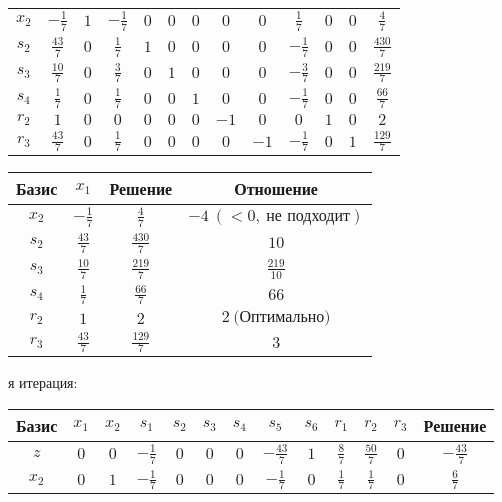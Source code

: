 \documentclass{article}%
\begin{document}
\begin{flushleft}
\begin{tabular}{|c|ccccccccccc|c|}
\hline%
$x_{2}$&$-\frac{1}{7}$&$1$&$-\frac{1}{7}$&$0$&$0$&$0$&$0$&$0$&$\frac{1}{7}$&$0$&$0$&$\frac{4}{7}$\\%
$s_{2}$&$\frac{43}{7}$&$0$&$\frac{1}{7}$&$1$&$0$&$0$&$0$&$0$&$-\frac{1}{7}$&$0$&$0$&$\frac{430}{7}$\\%
$s_{3}$&$\frac{10}{7}$&$0$&$\frac{3}{7}$&$0$&$1$&$0$&$0$&$0$&$-\frac{3}{7}$&$0$&$0$&$\frac{219}{7}$\\%
$s_{4}$&$\frac{1}{7}$&$0$&$\frac{1}{7}$&$0$&$0$&$1$&$0$&$0$&$-\frac{1}{7}$&$0$&$0$&$\frac{66}{7}$\\%
$r_{2}$&$1$&$0$&$0$&$0$&$0$&$0$&$-1$&$0$&$0$&$1$&$0$&$2$\\%
$r_{3}$&$\frac{43}{7}$&$0$&$\frac{1}{7}$&$0$&$0$&$0$&$0$&$-1$&$-\frac{1}{7}$&$0$&$1$&$\frac{129}{7}$\\%
\hline%
\end{tabular}%
\newline%
\newline%
\newline%
\begin{tabular}{|cccc|}%
\hline%
Базис&$x_{1}$&Решение&Отношение\\%
\hline%
$x_{2}$&$-\frac{1}{7}$&$\frac{4}{7}$&$-4\: (< 0, \: \text{не подходит})$\\%
$s_{2}$&$\frac{43}{7}$&$\frac{430}{7}$&$10$\\%
$s_{3}$&$\frac{10}{7}$&$\frac{219}{7}$&$\frac{219}{10}$\\%
$s_{4}$&$\frac{1}{7}$&$\frac{66}{7}$&$66$\\%
$r_{2}$&$1$&$2$&$2\: \text{(Оптимально)}$\\%
$r_{3}$&$\frac{43}{7}$&$\frac{129}{7}$&$3$\\%
\hline%
\end{tabular}%
\newline%
\newline%
я итерация: %
\newline%
\newline%
\renewcommand{\arraystretch}{1.3}%
\begin{tabular}{|c|ccccccccccc|c|}%
\hline%
Базис&$x_{1}$&$x_{2}$&$s_{1}$&$s_{2}$&$s_{3}$&$s_{4}$&$s_{5}$&$s_{6}$&$r_{1}$&$r_{2}$&$r_{3}$&Решение\\%
\hline%
$z$&$0$&$0$&$-\frac{1}{7}$&$0$&$0$&$0$&$-\frac{43}{7}$&$1$&$\frac{8}{7}$&$\frac{50}{7}$&$0$&$-\frac{43}{7}$\\%
\hline%
$x_{2}$&$0$&$1$&$-\frac{1}{7}$&$0$&$0$&$0$&$-\frac{1}{7}$&$0$&$\frac{1}{7}$&$\frac{1}{7}$&$0$&$\frac{6}{7}$\\%

\end{tabular}
\end{flushleft}
\end{document}
